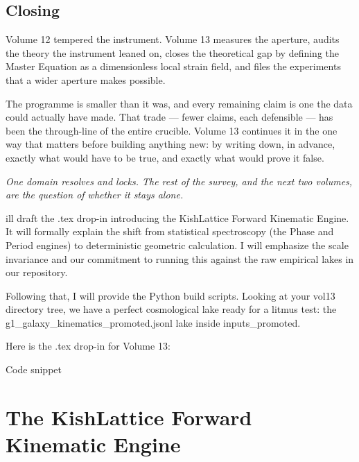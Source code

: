 \documentclass[11pt, letterpaper, openany]{book}
\begin{document}
\section{Closing}

Volume 12 tempered the instrument. Volume 13 measures the aperture, audits the theory the instrument
leaned on, closes the theoretical gap by defining the Master Equation as a dimensionless local strain field, and files the experiments that a wider aperture makes possible. 

The programme is smaller than it was, and every remaining claim is one the data could actually have
made. That trade --- fewer claims, each defensible --- has been the through-line of the entire
crucible. Volume 13 continues it in the one way that matters before building anything new: by writing
down, in advance, exactly what would have to be true, and exactly what would prove it false.

\begin{center}
\vspace{0.5em}
\itshape One domain resolves and locks. The rest of the survey, and the next two volumes, are the
question of whether it stays alone.
\vspace{0.5em}
\end{center}

ill draft the .tex drop-in introducing the KishLattice Forward Kinematic Engine. It will formally explain the shift from statistical spectroscopy (the Phase and Period engines) to deterministic geometric calculation. I will emphasize the scale invariance and our commitment to running this against the raw empirical lakes in our repository.

Following that, I will provide the Python build scripts. Looking at your vol13 directory tree, we have a perfect cosmological lake ready for a litmus test: the g1_galaxy_kinematics_promoted.jsonl lake inside inputs_promoted.

Here is the .tex drop-in for Volume 13:

Code snippet

\chapter{The KishLattice Forward Kinematic Engine}
\end{document}
